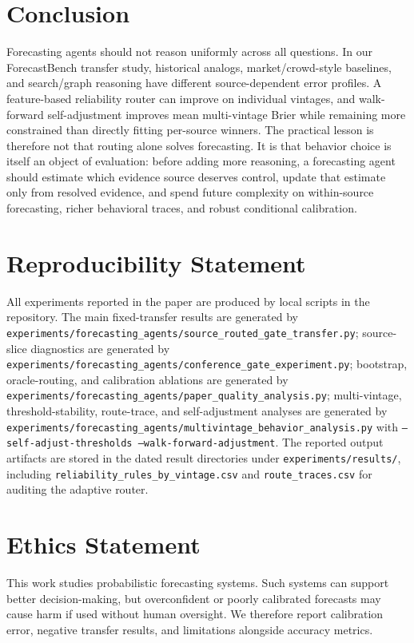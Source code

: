 \documentclass{article}
\begin{document}
\section{Conclusion}

Forecasting agents should not reason uniformly across all questions. In our ForecastBench transfer study, historical analogs, market/crowd-style baselines, and search/graph reasoning have different source-dependent error profiles. A feature-based reliability router can improve on individual vintages, and walk-forward self-adjustment improves mean multi-vintage Brier while remaining more constrained than directly fitting per-source winners. The practical lesson is therefore not that routing alone solves forecasting. It is that behavior choice is itself an object of evaluation: before adding more reasoning, a forecasting agent should estimate which evidence source deserves control, update that estimate only from resolved evidence, and spend future complexity on within-source forecasting, richer behavioral traces, and robust conditional calibration.

\section*{Reproducibility Statement}

All experiments reported in the paper are produced by local scripts in the repository. The main fixed-transfer results are generated by \texttt{experiments/forecasting\_agents/source\_routed\_gate\_transfer.py}; source-slice diagnostics are generated by \texttt{experiments/forecasting\_agents/conference\_gate\_experiment.py}; bootstrap, oracle-routing, and calibration ablations are generated by \texttt{experiments/forecasting\_agents/paper\_quality\_analysis.py}; multi-vintage, threshold-stability, route-trace, and self-adjustment analyses are generated by \texttt{experiments/forecasting\_agents/multivintage\_behavior\_analysis.py} with \texttt{--self-adjust-thresholds --walk-forward-adjustment}. The reported output artifacts are stored in the dated result directories under \texttt{experiments/results/}, including \texttt{reliability\_rules\_by\_vintage.csv} and \texttt{route\_traces.csv} for auditing the adaptive router.

\section*{Ethics Statement}

This work studies probabilistic forecasting systems. Such systems can support better decision-making, but overconfident or poorly calibrated forecasts may cause harm if used without human oversight. We therefore report calibration error, negative transfer results, and limitations alongside accuracy metrics.



\end{document}
